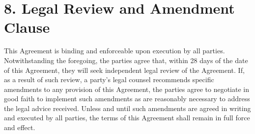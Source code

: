 \section*{8. Legal Review and Amendment Clause}

This Agreement is binding and enforceable upon execution by all parties. Notwithstanding the foregoing, the parties agree that, within 28 days of the date of this Agreement, they will seek independent legal review of the Agreement. If, as a result of such review, a party's legal counsel recommends specific amendments to any provision of this Agreement, the parties agree to negotiate in good faith to implement such amendments as are reasonably necessary to address the legal advice received. Unless and until such amendments are agreed in writing and executed by all parties, the terms of this Agreement shall remain in full force and effect. 